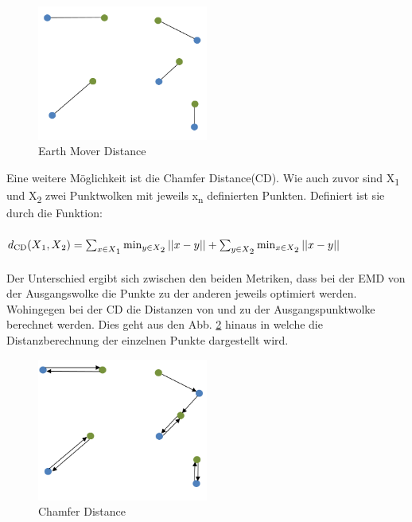 \documentclass{llncs}
\begin{document}
\begin{figure}[htbp] 
	\centering
	\includegraphics[width=0.5\textwidth]{emd_distance.png}
	\caption{Earth Mover Distance}
	\label{fig:Bild14}
\end{figure}		
Eine weitere Möglichkeit ist die Chamfer Distance(CD). Wie auch zuvor sind  X\textsubscript{1} und X\textsubscript{2} zwei Punktwolken mit jeweils x\textsubscript{n} definierten Punkten\cite{autoencoderloss}. Definiert ist sie durch die Funktion:
\\\\
\begin{math}
d\textsubscript{CD}(X\textsubscript{1},X\textsubscript{2})=\sum_{x\in X\textsubscript{1}} \min_{y \in X\textsubscript{2}}||x-y|| + \sum_{y\in X\textsubscript{2}} \min_{x \in X\textsubscript{2}}||x-y||
\end{math}
\\\\
Der Unterschied ergibt sich zwischen den beiden Metriken, dass bei der EMD von der Ausgangswolke die Punkte zu der anderen jeweils optimiert werden. Wohingegen bei der CD die Distanzen von und zu der Ausgangspunktwolke berechnet werden. Dies geht aus den Abb. \ref{fig:Bild15} hinaus in welche die Distanzberechnung der einzelnen Punkte dargestellt wird\cite{autoencoderloss}.

\begin{figure}[htbp] 
	\centering
	\includegraphics[width=0.5\textwidth]{champfer.png}
	\caption{Chamfer Distance}
	\label{fig:Bild15}
\end{figure} 
\newpage
\end{document}
